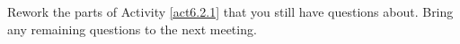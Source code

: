 \label{fnt6.2.1-1}

Rework the parts of Activity \ref{act6.2.1} that you still have questions about. Bring any remaining questions to the next \DL{} meeting.
